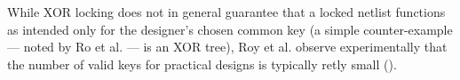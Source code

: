 While XOR locking does not in general guarantee that a locked netlist functions as intended only for the designer's chosen common key (a simple counter-example --- noted by Ro et al. ---  is an XOR tree), Roy et al. observe experimentally that the number of valid keys for practical designs is typically retly small ().


